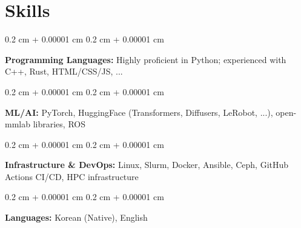 \documentclass[10pt, letterpaper]{article}
\newenvironment{highlights}{
    \begin{itemize}[
        topsep=0.10 cm,
        parsep=0.10 cm,
        partopsep=0pt,
        itemsep=0pt,
        leftmargin=0.4 cm + 10pt
    ]
}{
    \end{itemize}
} %
\newenvironment{onecolentry}{
    \begin{adjustwidth}{
        0.2 cm + 0.00001 cm
    }{
        0.2 cm + 0.00001 cm
    }
}{
    \end{adjustwidth}
} %
\newenvironment{twocolentry}[2][]{
    \onecolentry
    \def\secondColumn{#2}
    \setcolumnwidth{\fill, 4.5 cm}
    \begin{paracol}{2}
}{
    \switchcolumn \raggedleft \secondColumn
    \end{paracol}
    \endonecolentry
} %
\let\hrefWithoutArrow\href
\renewcommand{\href}[2]{\hrefWithoutArrow{#1}{\ifthenelse{\equal{#2}{}}{ }{#2 }\raisebox{.15ex}{\footnotesize \faExternalLink*}}}
\begin{document}



\section{Skills}

\begin{onecolentry}
    \textbf{Programming Languages:} Highly proficient in Python; experienced with C++, Rust, HTML/CSS/JS, ...
\end{onecolentry}

\vspace{0.1 cm}

\begin{onecolentry}
    \textbf{ML/AI:} PyTorch, HuggingFace (Transformers, Diffusers, LeRobot, ...), open-mmlab libraries, ROS
\end{onecolentry}

\vspace{0.1 cm}

\begin{onecolentry}
    \textbf{Infrastructure \& DevOps:} Linux, Slurm, Docker, Ansible, Ceph, GitHub Actions CI/CD, HPC infrastructure
\end{onecolentry}

\vspace{0.1 cm}

\begin{onecolentry}
    \textbf{Languages:} Korean (Native), English
\end{onecolentry}
\end{document}
